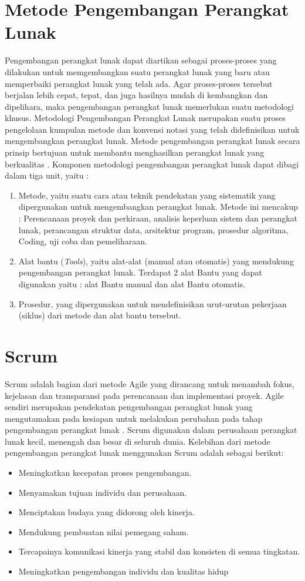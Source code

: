 \section{Metode Pengembangan Perangkat Lunak}
Pengembangan perangkat lunak dapat diartikan sebagai proses-proses yang dilakukan untuk memgembangkan suatu perangkat lunak yang baru atau memperbaiki perangkat lunak yang telah ada. Agar proses-proses tersebut berjalan lebih cepat, tepat, dan juga hasilnya mudah di kembangkan dan dipelihara, maka pengembangan perangkat lunak memerlukan suatu metodologi khusus. Metodologi Pengembangan Perangkat Lunak merupakan suatu proses pengelolaan kumpulan metode dan konvensi notasi yang telah didefinisikan untuk mengembangkan perangkat lunak. Metode pengembangan perangkat lunak secara prinsip bertujuan untuk membantu menghasilkan perangkat lunak yang berkualitas \citep{jauhari}. Komponen metodologi pengembangan perangkat lunak dapat dibagi dalam tiga unit, yaitu \citep{pressman2005software}:
\begin{enumerate}
	\item Metode, yaitu suatu cara atau teknik pendekatan yang sistematik yang dipergunakan untuk mengembangkan perangkat lunak. Metode ini mencakup : Perencanaan proyek dan  perkiraan, analisis keperluan sistem dan perangkat lunak, perancangan struktur data, arsitektur program, prosedur algoritma, Coding, uji coba dan pemeliharaan.
	\item Alat bantu (\textit{Tools}), yaitu alat-alat (manual atau otomatis) yang mendukung pengembangan  perangkat lunak. Terdapat 2 alat Bantu yang dapat digunakan yaitu : alat Bantu manual dan alat Bantu otomatis.
	\item Prosedur, yang dipergunakan untuk mendefinisikan urut-urutan pekerjaan (siklus) dari metode dan alat bantu tersebut.
\end{enumerate}

\section{Scrum}
Scrum adalah bagian dari metode Agile yang dirancang untuk menambah fokus, kejelasan dan transparansi pada perencanaan dan implementasi proyek. Agile sendiri merupakan pendekatan pengembangan perangkat lunak yang mengutamakan pada kesiapan untuk melakukan perubahan pada tahap pengembangan perangkat lunak \citep{raharjana2017pengembangan}. Scrum digunakan dalam perusahaan perangkat lunak kecil, menengah dan besar di seluruh dunia. Kelebihan dari metode pengembangan perangkat lunak menggunakan Scrum adalah sebagai berikut: 
\begin{itemize}
	\itemsep0em
	\item Meningkatkan kecepatan proses pengembangan.
	\item Menyamakan tujuan individu dan perusahaan.
	\item Menciptakan budaya yang didorong oleh kinerja.
	\item Mendukung pembuatan nilai pemegang saham.
	\item Tercapainya komunikasi kinerja yang stabil dan konsisten di semua tingkatan.
	\item Meningkatkan pengembangan individu dan kualitas hidup
\end{itemize}

